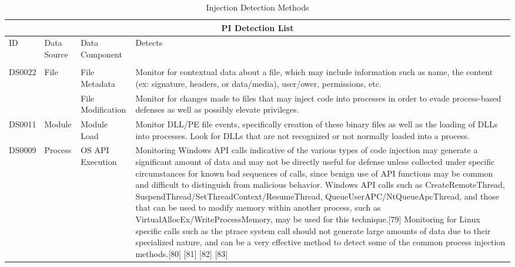 \documentclass{article}
\begin{document}
\begin{table}[!ht]
\centering
\caption{Injection Detection Methods \autocite{Mitre:2017}}
\begin{tabular}{ |p{1.2cm}||p{2cm}|p{3cm}|p{8cm}|  }
  \hline
  \multicolumn{4}{|c|}{PI Detection List} \\
  \hline
  ID	& Data Source & Data Component & Detects \\
  \hline
   & & & \\
  DS0022 & File & File Metadata & Monitor for contextual data about a file, which may include information such as name,
                                  the content (ex: signature, headers, or data/media), user/ower, permissions, etc. \\
        & & File Modification & Monitor for changes made to files that may inject code into processes in order to evade
                                process-based defenses as well as possibly elevate privileges. \\
  \hline
  DS0011 & Module & Module Load & Monitor DLL/PE file events, specifically creation of these binary files as well as
                                  the loading of DLLs into processes. Look for DLLs that are not recognized or not
                                  normally loaded into a process. \\
  \hline
  DS0009 & Process & OS API Execution & Monitoring Windows API calls indicative of the various types of code injection
                                        may generate a significant amount of data and may not be directly useful for
                                        defense unless collected under specific circumstances for known bad sequences
                                        of calls, since benign use of API functions may be common and difficult to
                                        distinguish from malicious behavior. Windows API calls such as CreateRemoteThread,
                                        SuspendThread/SetThreadContext/ResumeThread, QueueUserAPC/NtQueueApcThread, and
                                        those that can be used to modify memory within another process, such as
                                        VirtualAllocEx/WriteProcessMemory, may be used for this technique.[79] Monitoring
                                        for Linux specific calls such as the ptrace system call should not generate large
                                        amounts of data due to their specialized nature, and can be a very effective
                                        method to detect some of the common process injection methods.[80] [81] [82] [83] \\

\end{tabular}
\end{table}
\end{document}
